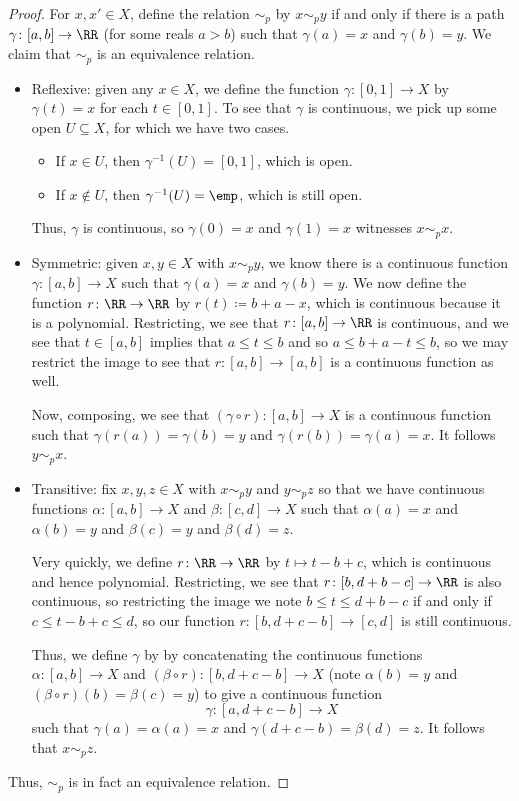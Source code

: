 \documentclass[../notes.tex]{subfiles}
\begin{document}
\begin{proof}
	For $x,x'\in X$, define the relation $\sim_p$ by $x\sim_py$ if and only if there is a path $\gamma\colon[a,b]\to\RR$ (for some reals $a>b$) such that $\gamma(a)=x$ and $\gamma(b)=y$. We claim that $\sim_p$ is an equivalence relation.
	\begin{itemize}
		\item Reflexive: given any $x\in X$, we define the function $\gamma\colon[0,1]\to X$ by $\gamma(t)=x$ for each $t\in[0,1]$. To see that $\gamma$ is continuous, we pick up some open $U\subseteq X$, for which we have two cases.
		\begin{itemize}
			\item If $x\in U$, then $\gamma^{-1}(U)=[0,1]$, which is open.
			\item If $x\notin U$, then $\gamma^{-1}(U)=\emp$, which is still open.
		\end{itemize}
		Thus, $\gamma$ is continuous, so $\gamma(0)=x$ and $\gamma(1)=x$ witnesses $x\sim_px$.
		\item Symmetric: given $x,y\in X$ with $x\sim_py$, we know there is a continuous function $\gamma\colon[a,b]\to X$ such that $\gamma(a)=x$ and $\gamma(b)=y$. We now {define the function $r\colon\RR\to\RR$ by $r(t)\coloneqq b+a-x$}, which is continuous because it is a polynomial. Restricting, we see that $r\colon[a,b]\to\RR$ is continuous, and we see that $t\in[a,b]$ implies that $a\le t\le b$ and so $a\le b+a-t\le b$, so we may restrict the image to see that $r\colon[a,b]\to[a,b]$ is a continuous function as well.

		Now, composing, we see that $(\gamma\circ r)\colon[a,b]\to X$ is a continuous function such that $\gamma(r(a))=\gamma(b)=y$ and $\gamma(r(b))=\gamma(a)=x$. It follows $y\sim_px$.
		\item Transitive: fix $x,y,z\in X$ with $x\sim_py$ and $y\sim_pz$ so that we have continuous functions $\alpha\colon[a,b]\to X$ and $\beta\colon[c,d]\to X$ such that $\alpha(a)=x$ and $\alpha(b)=y$ and $\beta(c)=y$ and $\beta(d)=z$.

		Very quickly, we define $r\colon\RR\to\RR$ by $t\mapsto t-b+c$, which is continuous and hence polynomial. Restricting, we see that $r\colon[b,d+b-c]\to\RR$ is also continuous, so restricting the image we note $b\le t\le d+b-c$ if and only if $c\le t-b+c\le d$, so our function $r\colon[b,d+c-b]\to[c,d]$ is still continuous.

		Thus, we {define $\gamma$ by  by concatenating the continuous functions $\alpha\colon[a,b]\to X$ and $(\beta\circ r)\colon[b,d+c-b]\to X$} (note $\alpha(b)=y$ and $(\beta\circ r)(b)=\beta(c)=y$) to give a continuous function
		\[\gamma\colon[a,d+c-b]\to X\]
		such that $\gamma(a)=\alpha(a)=x$ and $\gamma(d+c-b)=\beta(d)=z$. It follows that $x\sim_pz$.
	\end{itemize}
	Thus, $\sim_p$ is in fact an equivalence relation.
	

\end{proof}
\end{document}
